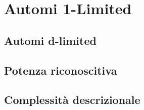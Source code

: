 \chapter{Automi 1-Limited}



\section{Automi d-limited}



\section{Potenza riconoscitiva}



\section{Complessità descrizionale}
